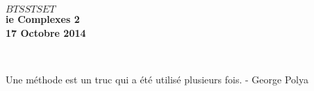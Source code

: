 \documentclass[11pt]{article}
\begin{document}

\begin{minipage}[t]{\textwidth}
  \raggedright
      {\bfseries $BTS STS ET$}\\[.35ex]
      \vspace*{-1cm}
      \raggedleft
          {\bfseries ie Complexes 2}\\[.35ex]
          {\bfseries 17 Octobre 2014}\\[.35ex]
\end{minipage}\\[1em]

\begin{center}
  \textsf{Une méthode est un truc qui a été utilisé plusieurs fois. - George Polya}\\
\end{center}


\setlength{\columnseprule}{1pt}
\end{document}
